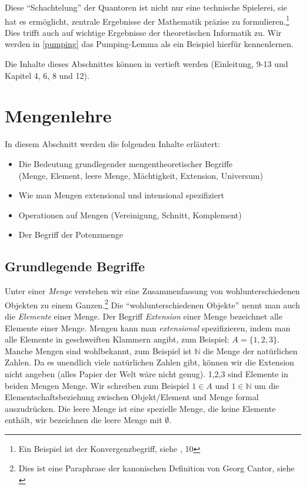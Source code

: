 Diese ``Schachtelung'' der Quantoren ist nicht nur eine technische Spielerei,
sie hat es ermöglicht, zentrale Ergebnisse der Mathematik präzise zu formulieren.\footnote{
    Ein Beispiel ist der Konvergenzbegriff, siehe \cite{link}, 10
}
Dies trifft auch auf wichtige Ergebnisse der theoretischen Informatik zu.
Wir werden in \autoref{pumping} das Pumping-Lemma als ein Beispiel hierfür kennenlernen.

Die Inhalte dieses Abschnittes können in \cite{link} vertieft werden
(Einleitung, 9-13 und Kapitel 4, 6, 8 und 12).

\section{Mengenlehre}\label{mengenlehre}
In diesem Abschnitt werden die folgenden Inhalte erläutert:
\begin{itemize}
    \item Die Bedeutung grundlegender mengentheoretischer Begriffe\\
        (Menge, Element, leere Menge, Mächtigkeit, Extension, Universum)
    \item Wie man Mengen extensional und intensional spezifiziert
    \item Operationen auf Mengen (Vereinigung, Schnitt, Komplement)
    \item Der Begriff der Potenzmenge
\end{itemize}
\subsection{Grundlegende Begriffe}\label{grundmenge}
Unter einer \emph{Menge} verstehen wir eine Zusammenfassung von wohlunterschiedenen Objekten
zu einem Ganzen.\footnote{
    Dies ist eine Paraphrase der kanonischen Definition von Georg Cantor, siehe \cite{cantor}
}
Die ``wohlunterschiedenen Objekte'' nennt man auch die \emph{Elemente} einer Menge.
Der Begriff \emph{Extension} einer Menge bezeichnet alle Elemente einer Menge.
Mengen kann man \emph{extensional} spezifizieren,
indem man alle Elemente in geschweiften Klammern angibt,
zum Beispiel: $A = \{ 1,2,3 \}$.
Manche Mengen sind wohlbekannt,
zum Beispiel ist $\mathbb{N}$ die Menge der natürlichen Zahlen.
Da es unendlich viele natürlichen Zahlen gibt,
können wir die Extension nicht angeben
(alles Papier der Welt wäre nicht genug).
1,2,3 sind Elemente in beiden Mengen Menge.
Wir schreiben zum Beispiel $1 \in A$ und $1 \in \mathbb{N}$
um die Elementschaftsbeziehung zwischen Objekt/Element und Menge formal auszudrücken.
Die leere Menge ist eine spezielle Menge, die keine Elemente enthält,
wir bezeichnen die leere Menge mit $\emptyset$.

